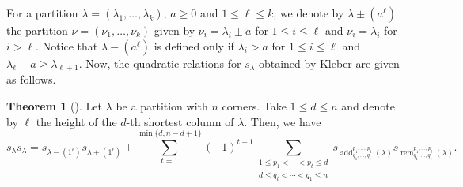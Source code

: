 \documentclass[12pt]{amsart}%
\theoremstyle{definition}
\newtheorem{theorem}{Theorem}[section]
\DeclareMathOperator{\add}{add}
\DeclareMathOperator{\rem}{rem}
\begin{document}

For a partition $\lambda=(\lambda_1,\ldots,\lambda_k)$, $a\ge 0$ and $1\le \ell\le k$, 
we denote by $\lambda\pm (a^{\ell})$ the partition $\nu=(\nu_1,\ldots,\nu_k)$
given by $\nu_i=\lambda_i\pm a$ for $1\le i\le \ell$ and $\nu_i=\lambda_i$ for $i>\ell$.
Notice that $\lambda-(a^{\ell})$ is defined only if 
$\lambda_i>a$ for $1\le i\le \ell$ and $\lambda_{\ell}-a\ge \lambda_{\ell+1}$.
Now, the quadratic relations for $s_{\lambda}$ obtained by Kleber \cite{k01} are given as follows.

\begin{theorem}[{\cite[Theorem 4.2]{k01}}]
\label{thm:kPlucker}
Let $\lambda$ be a partition with $n$ corners.
Take $1\le d\le n$ and denote by $\ell$ 
the height of the $d$-th shortest column of $\lambda$.
Then, we have  
\begin{equation}
s_{\lambda}s_{\lambda}
=s_{\lambda-(1^{\ell})}s_{\lambda+(1^{\ell})}
+\sum^{\min\{d,n-d+1\}}_{t=1}(-1)^{t-1}
\sum_{\substack{1\le p_1<\cdots<p_t\le d \\ d\le q_t<\cdots<q_1\le n}}
s_{\add^{p_1,\ldots,p_t}_{q_1,\ldots,q_t}(\lambda)}
s_{\rem^{p_1,\ldots,p_t}_{q_1,\ldots,q_t}(\lambda)}.
\end{equation}
\end{theorem}
\end{document}
